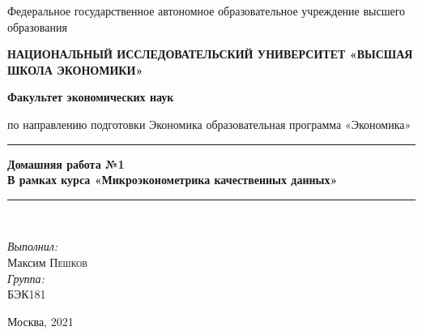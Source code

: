 \documentclass[a4paper,12pt]{article}
\date{\today}
\begin{document}
	
	\begin{titlepage}
		\newpage
		
		\begin{center}
			\large{Федеральное государственное автономное образовательное учреждение высшего образования} \\
		\end{center}
		
		\begin{center}
			\large \textbf{НАЦИОНАЛЬНЫЙ ИССЛЕДОВАТЕЛЬСКИЙ УНИВЕРСИТЕТ
				«ВЫСШАЯ ШКОЛА ЭКОНОМИКИ»
			} \\
		\end{center}
		
		\vspace{1em}
		
		\begin{center}
			\Large \textbf{Факультет экономических наук} \\
		\end{center}
		\begin{center}
			\large {по направлению подготовки Экономика} \linebreak \large {образовательная программа «Экономика»}
			
		\end{center}
		
		\vspace{2em}
		
		\vspace{0.5em}
		\rule{\linewidth}{0.3mm}
		\begin{center}
			\huge \textbf{Домашняя работа №1} \\[0.4cm]
			\LARGE \textbf{В рамках курса
				«Микроэконометрика качественных данных»
}
		\end{center}
		\rule{\linewidth}{0.3mm} \\[0.4cm]
		
		\vspace{18em}
		\begin{flushright}
			\large
			\textit{Выполнил:}\\
			Максим \textsc{Пешков} \\
			\textit{Группа:}\\
			БЭК181
		\end{flushright}
		
		\vspace{5em}
		
		\begin{center}
			Москва, 2021
		\end{center}
		
	\end{titlepage}
	
\end{document}
